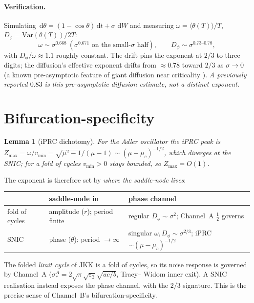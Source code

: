 \documentclass[11pt]{article}
\newtheorem{lemma}{Lemma}
\theoremstyle{remark}
\newcommand{\dd}{\,\mathrm{d}}
\begin{document}
\paragraph{Verification.} Simulating $\dd\theta=(1-\cos\theta)\dd t+\sigma\,\dd W$ and
measuring $\omega=\langle\theta(T)\rangle/T$, $D_\phi=\mathrm{Var}(\theta(T))/2T$:
\[
  \omega\sim\sigma^{0.668}\ (\sigma^{0.671}\text{ on the small-}\sigma\text{ half}),
  \qquad D_\phi\sim\sigma^{0.73\text{--}0.78},
\]
with $D_\phi/\omega\approx1.1$ roughly constant. The drift pins the exponent at $2/3$ to
three digits; the diffusion's effective exponent drifts from $\approx0.78$ toward $2/3$ as
$\sigma\to0$ (a known pre-asymptotic feature of giant diffusion near criticality
\cite{Reimann}). \emph{A previously reported $0.83$ is this pre-asymptotic diffusion
estimate, not a distinct exponent.}

\section{Bifurcation-specificity}

\begin{lemma}[iPRC dichotomy]\label{lem:iprc}
For the Adler oscillator the iPRC peak is $Z_{\max}=\omega/v_{\min}=
\sqrt{\mu^2-1}/(\mu-1)\sim(\mu-\mu_c)^{-1/2}$, which diverges at the SNIC; for a fold of
cycles $v_{\min}>0$ stays bounded, so $Z_{\max}=O(1)$.
\end{lemma}

The exponent is therefore set by \emph{where the saddle-node lives}:
\begin{center}
\begin{tabular}{lll}
\hline
 & saddle-node in & phase channel \\
\hline
fold of cycles & amplitude ($r$); period finite & regular $D_\phi\sim\sigma^2$; Channel~A $\tfrac12$ governs\\
SNIC & phase ($\theta$); period $\to\infty$ & singular $\omega,D_\phi\sim\sigma^{2/3}$; iPRC $\sim(\mu-\mu_c)^{-1/2}$\\
\hline
\end{tabular}
\end{center}

\noindent The folded \emph{limit cycle} of JKK is a fold of cycles, so its noise response
is governed by Channel~A ($\sigma_*^A=2\sqrt\pi\sqrt{\varepsilon_2}\sqrt{ac/b}$, Tracy--
Widom inner exit). A SNIC realisation instead exposes the phase channel, with the $2/3$
signature. This is the precise sense of Channel~B's bifurcation-specificity.
\end{document}
